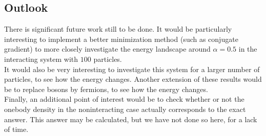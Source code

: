 \documentclass[a4paper, 10pt]{article}
\begin{document}
	\subsection{Outlook}
	There is significant future work still to be done. It would be particularly interesting to implement a better minimization method (such as conjugate gradient) to more closely investigate the energy landscape around $\alpha=0.5$ in the interacting system with $100$ particles.\\
	\linebreak
	It would also be very interesting to investigate this system for a larger number of particles, to see how the energy changes. Another extension of these results would be to replace bosons by fermions, to see how the energy changes.\\
	\linebreak
	Finally, an additional point of interest would be to check whether or not the onebody density in the noninteracting case actually corresponds to the exact answer. This answer may be calculated, but we have not done so here, for a lack of time.
	
	
\end{document}
